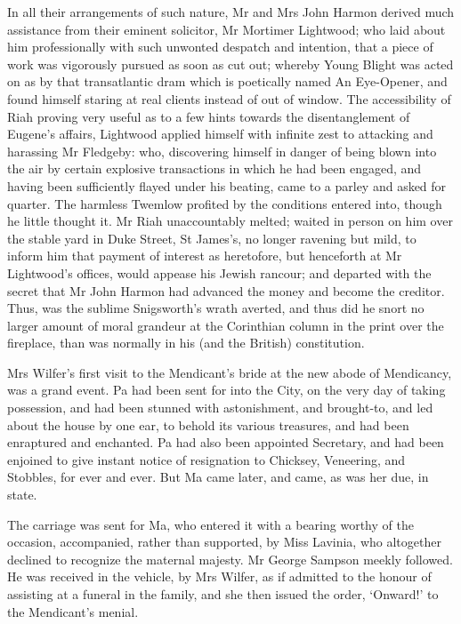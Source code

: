 In all their arrangements of such nature, Mr and Mrs John Harmon derived
much assistance from their eminent solicitor, Mr Mortimer Lightwood; who
laid about him professionally with such unwonted despatch and intention,
that a piece of work was vigorously pursued as soon as cut out; whereby
Young Blight was acted on as by that transatlantic dram which is
poetically named An Eye-Opener, and found himself staring at real
clients instead of out of window. The accessibility of Riah proving
very useful as to a few hints towards the disentanglement of Eugene’s
affairs, Lightwood applied himself with infinite zest to attacking and
harassing Mr Fledgeby: who, discovering himself in danger of being blown
into the air by certain explosive transactions in which he had been
engaged, and having been sufficiently flayed under his beating, came
to a parley and asked for quarter. The harmless Twemlow profited by
the conditions entered into, though he little thought it. Mr Riah
unaccountably melted; waited in person on him over the stable yard in
Duke Street, St James’s, no longer ravening but mild, to inform him
that payment of interest as heretofore, but henceforth at Mr Lightwood’s
offices, would appease his Jewish rancour; and departed with the secret
that Mr John Harmon had advanced the money and become the creditor.
Thus, was the sublime Snigsworth’s wrath averted, and thus did he snort
no larger amount of moral grandeur at the Corinthian column in the
print over the fireplace, than was normally in his (and the British)
constitution.


Mrs Wilfer’s first visit to the Mendicant’s bride at the new abode of
Mendicancy, was a grand event. Pa had been sent for into the City,
on the very day of taking possession, and had been stunned with
astonishment, and brought-to, and led about the house by one ear, to
behold its various treasures, and had been enraptured and enchanted. Pa
had also been appointed Secretary, and had been enjoined to give instant
notice of resignation to Chicksey, Veneering, and Stobbles, for ever and
ever. But Ma came later, and came, as was her due, in state.

The carriage was sent for Ma, who entered it with a bearing worthy of
the occasion, accompanied, rather than supported, by Miss Lavinia, who
altogether declined to recognize the maternal majesty. Mr George Sampson
meekly followed. He was received in the vehicle, by Mrs Wilfer, as if
admitted to the honour of assisting at a funeral in the family, and she
then issued the order, ‘Onward!’ to the Mendicant’s menial.


